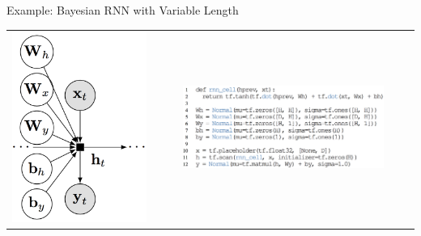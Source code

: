 \documentclass[final]{beamer}
\begin{document}
\begin{frame}[t]
\begin{columns}[t]
\begin{column}{\onecolwid}
\begin{block}{Example: Bayesian RNN with Variable Length}
\begin{tabular}{cc}
\hspace{-1.5em}
\includegraphics{img/bayesian_rnn_graph.png}
&
\includegraphics[width=0.80\textwidth]{img/bayesian_rnn_code.png}
\end{tabular}
\vspace{-2ex}
\end{block}


\end{column}
\end{columns}
\end{frame}
\end{document}
